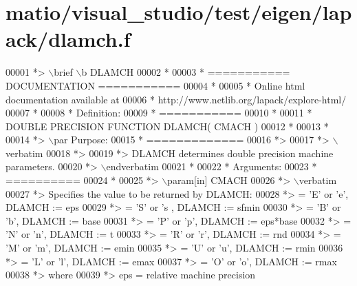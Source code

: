 \hypertarget{matio_2visual__studio_2test_2eigen_2lapack_2dlamch_8f_source}{}\section{matio/visual\+\_\+studio/test/eigen/lapack/dlamch.f}
\label{matio_2visual__studio_2test_2eigen_2lapack_2dlamch_8f_source}

\begin{DoxyCode}
00001 \textcolor{comment}{*> \(\backslash\)brief \(\backslash\)b DLAMCH}
00002 \textcolor{comment}{*}
00003 \textcolor{comment}{*  =========== DOCUMENTATION ===========}
00004 \textcolor{comment}{*}
00005 \textcolor{comment}{* Online html documentation available at }
00006 \textcolor{comment}{*            http://www.netlib.org/lapack/explore-html/ }
00007 \textcolor{comment}{*}
00008 \textcolor{comment}{*  Definition:}
00009 \textcolor{comment}{*  ===========}
00010 \textcolor{comment}{*}
00011 \textcolor{comment}{*      DOUBLE PRECISION FUNCTION DLAMCH( CMACH )}
00012 \textcolor{comment}{*  }
00013 \textcolor{comment}{*}
00014 \textcolor{comment}{*> \(\backslash\)par Purpose:}
00015 \textcolor{comment}{*  =============}
00016 \textcolor{comment}{*>}
00017 \textcolor{comment}{*> \(\backslash\)verbatim}
00018 \textcolor{comment}{*>}
00019 \textcolor{comment}{*> DLAMCH determines double precision machine parameters.}
00020 \textcolor{comment}{*> \(\backslash\)endverbatim}
00021 \textcolor{comment}{*}
00022 \textcolor{comment}{*  Arguments:}
00023 \textcolor{comment}{*  ==========}
00024 \textcolor{comment}{*}
00025 \textcolor{comment}{*> \(\backslash\)param[in] CMACH}
00026 \textcolor{comment}{*> \(\backslash\)verbatim}
00027 \textcolor{comment}{*>          Specifies the value to be returned by DLAMCH:}
00028 \textcolor{comment}{*>          = 'E' or 'e',   DLAMCH := eps}
00029 \textcolor{comment}{*>          = 'S' or 's ,   DLAMCH := sfmin}
00030 \textcolor{comment}{*>          = 'B' or 'b',   DLAMCH := base}
00031 \textcolor{comment}{*>          = 'P' or 'p',   DLAMCH := eps*base}
00032 \textcolor{comment}{*>          = 'N' or 'n',   DLAMCH := t}
00033 \textcolor{comment}{*>          = 'R' or 'r',   DLAMCH := rnd}
00034 \textcolor{comment}{*>          = 'M' or 'm',   DLAMCH := emin}
00035 \textcolor{comment}{*>          = 'U' or 'u',   DLAMCH := rmin}
00036 \textcolor{comment}{*>          = 'L' or 'l',   DLAMCH := emax}
00037 \textcolor{comment}{*>          = 'O' or 'o',   DLAMCH := rmax}
00038 \textcolor{comment}{*>          where}
00039 \textcolor{comment}{*>          eps   = relative machine precision}

\end{DoxyCode}
